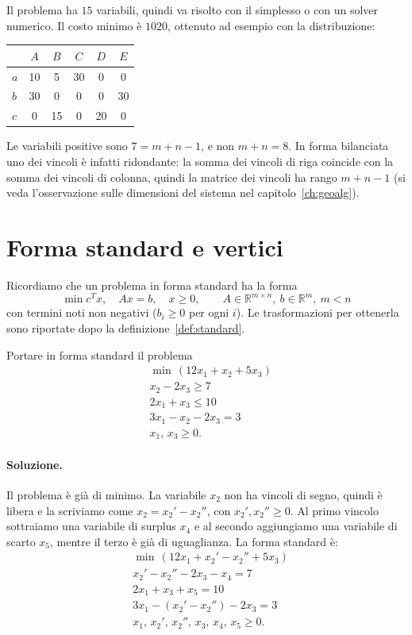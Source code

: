Il problema ha $15$ variabili, quindi va risolto con il simplesso o con un solver numerico. Il costo minimo è $1020$, ottenuto ad esempio con la distribuzione:
\begin{center}
\begin{tabular}{lccccc}
\toprule
 & $A$ & $B$ & $C$ & $D$ & $E$ \\
\midrule
$a$ & 10 & 5 & 30 & 0 & 0 \\
$b$ & 30 & 0 & 0 & 0 & 30 \\
$c$ & 0 & 15 & 0 & 20 & 0 \\
\bottomrule
\end{tabular}
\end{center}
Le variabili positive sono $7 = m + n - 1$, e non $m + n = 8$. In forma bilanciata uno dei vincoli è infatti ridondante: la somma dei vincoli di riga coincide con la somma dei vincoli di colonna, quindi la matrice dei vincoli ha rango $m + n - 1$ (si veda l'osservazione sulle dimensioni del sistema nel capitolo~\ref{ch:geoalg}).

\section{Forma standard e vertici}\label{sec:es-forma-standard}
Ricordiamo che un problema in forma standard ha la forma
\[
\min c^T x, \quad A x = b, \quad x \ge 0, \qquad A \in \mathbb{R}^{m \times n},\ b \in \mathbb{R}^m,\ m < n
\]
con termini noti non negativi ($b_i \ge 0$ per ogni $i$). Le trasformazioni per ottenerla sono riportate dopo la definizione~\ref{def:standard}.

\begin{esercizio}
Portare in forma standard il problema
\[
\begin{aligned}
&\min\, (12x_1 + x_2 + 5x_3) \\
&x_2 - 2x_3 \ge 7 \\
&2x_1 + x_3 \le 10 \\
&3x_1 - x_2 - 2x_3 = 3 \\
&x_1,\, x_3 \ge 0.
\end{aligned}
\]
\end{esercizio}

\paragraph{Soluzione.}
Il problema è già di minimo. La variabile $x_2$ non ha vincoli di segno, quindi è libera e la scriviamo come $x_2 = x_2' - x_2''$, con $x_2', x_2'' \ge 0$. Al primo vincolo sottraiamo una variabile di surplus $x_4$ e al secondo aggiungiamo una variabile di scarto $x_5$, mentre il terzo è già di uguaglianza. La forma standard è:
\[
\begin{aligned}
&\min\, (12x_1 + x_2' - x_2'' + 5x_3) \\
&x_2' - x_2'' - 2x_3 - x_4 = 7 \\
&2x_1 + x_3 + x_5 = 10 \\
&3x_1 - (x_2' - x_2'') - 2x_3 = 3 \\
&x_1,\, x_2',\, x_2'',\, x_3,\, x_4,\, x_5 \ge 0.
\end{aligned}
\]

